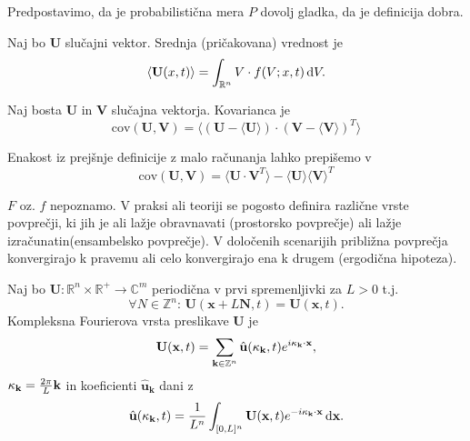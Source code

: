\documentclass[mat2, tisk]{fmfdelo}
\newcommand{\R}{\mathbb R}
\newcommand{\Z}{\mathbb Z}
\newcommand{\bd}{\textbf}
\newcommand{\C}{\mathbb C}
\begin{document}
\begin{opomba}
Predpostavimo, da je probabilistična mera $P$ dovolj gladka, da je definicija dobra.
\end{opomba}

\begin{definicija}
Naj bo $\bd{U}$ slučajni vektor. Srednja (pričakovana) vrednost je 
\begin{equation}
\langle \bd{U}(x, t) \rangle = \int_{\R^n} V \cdot f(V; x, t) \dif V.
\end{equation}
\end{definicija}

\begin{definicija}
Naj bosta $\bd{U}$ in $\bd{V}$ slučajna vektorja. Kovarianca je 
\begin{equation}
\text{cov}(\bd{U}, \bd{V}) = \langle (\bd{U} - \langle \bd{U} \rangle)\cdot (\bd{V} - \langle \bd{V} \rangle)^T \rangle
\end{equation}
\end{definicija}

\begin{opomba}
Enakost iz prejšnje definicije z malo računanja lahko prepišemo v 
\begin{equation}
\text{cov}(\bd{U}, \bd{V}) = \langle \bd{U}\cdot \bd{V}^T \rangle - \langle \bd{U} \rangle  \langle \bd{V} \rangle^T
\end{equation}
\end{opomba}

\noindent
$F$ oz. $f$ nepoznamo. V praksi ali teoriji se pogosto definira različne vrste povprečji, 
ki jih je ali lažje obravnavati (prostorsko povprečje) ali lažje izračunatin(ensambelsko povprečje).
V določenih scenarijih približna povprečja konvergirajo k pravemu 
ali celo konvergirajo ena k drugem (ergodična hipoteza). 

\begin{definicija}
Naj bo $\bd{U}: \R^n \times \R^+ \rightarrow \C^m$ periodična v prvi spremenljivki za $L>0$ t.j. 
$$
\forall N\in \Z^n: \,\bd{U}(\bd{x} + L\bd{N}, t) = \bd{U}(\bd{x}, t).
$$
Kompleksna Fourierova vrsta preslikave $\bd{U}$ je 
\begin{equation}
\bd{U}(\bd{x}, t) = \sum_{\bd{k}\in \Z^{n}} \hat{\bd{u}}(\bd{\text{$\kappa$}}_\bd{k}, t) e^{i\bd{\text{$\kappa$}}_\bd{k} \cdot \bd{x}},
\end{equation}
$\bd{\text{$\kappa$}}_\bd{k} = \frac{2\pi}{L} \bd{k}$ in koeficienti $\hat{\bd{u}}_\bd{k}$ dani z 
\begin{equation}
\hat{\bd{u}}(\bd{\text{$\kappa$}}_\bd{k}, t) = \frac{1}{L^n} \int_{[0, L]^n} \bd{U}(\bd{x}, t) e^{-i\bd{\text{$\kappa$}}_\bd{k} \cdot \bd{x}} \dif \bd{x}.
\end{equation}
\end{definicija}
\end{document}
